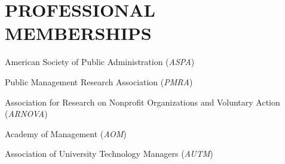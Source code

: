 \documentclass[letterpaper]{article}
\renewenvironment{itemize}{
  \begin{list}{}{
    \setlength{\leftmargin}{1.5em}
  }
}{
  \end{list}
}
\begin{document}
\section*{PROFESSIONAL MEMBERSHIPS}
\begin{itemize}
	
\item American Society of Public Administration ({\it ASPA})

\item Public Management Research Association ({\it PMRA})
	
\item Association for Research on Nonprofit Organizations and Voluntary Action ({\it ARNOVA})

\item Academy of Management ({\it AOM})

\item Association of University Technology Managers ({\it AUTM})

\end{itemize}

\bigskip

\end{document}
